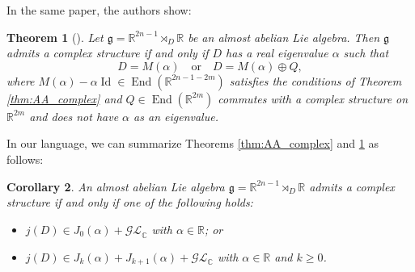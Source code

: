 \documentclass{article}
\newtheorem{theorem}{Theorem}[section]
\newtheorem{corollary}[theorem]{Corollary}
\theoremstyle{definition}
\DeclareMathOperator{\Id}{Id}
\DeclareMathOperator{\End}{End}
\newcommand{\R}{\mathbb{R}}
\newcommand{\C}{\mathbb{C}}
\newcommand{\frg}{\mathfrak{g}}
\newcommand{\lie}[1]{\mathfrak{#1}}
\newcommand{\g}{\lie g}
\begin{document}
In the same paper, the authors show:

\begin{theorem}[{\cite[Theorem 4.17]{ArroyoBarberisDiazGodoyHernandez}}]\label{thm:AA_complex_general}
    Let $\g=\R^{2n-1}\rtimes_D\R$ be an almost abelian Lie algebra. Then $\g$ admits a complex structure if and only if $D$ has a real eigenvalue $\alpha$ such that $$D=M(\alpha)\quad\text{or}\quad D=M(\alpha)\oplus Q,$$ where $M(\alpha)-\alpha\Id\in\End(\R^{2n-1-2m})$ satisfies the conditions of Theorem \ref{thm:AA_complex} and $Q\in\End(\R^{2m})$ commutes with a complex structure on $\R^{2m}$ and does not have $\alpha$ as an eigenvalue.
\end{theorem}

In our language, we can summarize Theorems \ref{thm:AA_complex} and \ref{thm:AA_complex_general} as follows:

\begin{corollary}\label{cor:ofArroyoetal}
    An almost abelian Lie algebra $\frg=\R^{2n-1}\rtimes_D\R$ admits a complex structure if and only if one of the following holds: \begin{itemize}
        \item $j(D)\in J_0(\alpha)+\mathcal{GL}_\C$ with $\alpha\in\R$; or
        \item $j(D)\in J_k(\alpha)+J_{k+1}(\alpha)+\mathcal{GL}_\C$ with $\alpha\in\R$ and $k\geq0$.
    \end{itemize}
\end{corollary}
\end{document}
